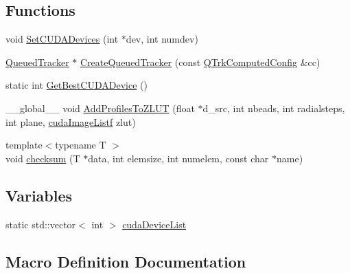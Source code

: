 \subsection*{Functions}
\begin{DoxyCompactItemize}
\item 
void \hyperlink{_queued_c_u_d_a_tracker_8cu_abda9d81bb47d6fd2b504bd3df9b2edae}{Set\+C\+U\+D\+A\+Devices} (int $\ast$dev, int numdev)
\item 
\hyperlink{class_queued_tracker}{Queued\+Tracker} $\ast$ \hyperlink{_queued_c_u_d_a_tracker_8cu_a04e7674e3705eefff30b5d6f5d3ab925}{Create\+Queued\+Tracker} (const \hyperlink{struct_q_trk_computed_config}{Q\+Trk\+Computed\+Config} \&cc)
\item 
static int \hyperlink{_queued_c_u_d_a_tracker_8cu_a19fc494f75b9dffe835d70fa70daae57}{Get\+Best\+C\+U\+D\+A\+Device} ()
\item 
\+\_\+\+\_\+global\+\_\+\+\_\+ void \hyperlink{_queued_c_u_d_a_tracker_8cu_aec3fff30d0a584140aaa1d322cc4a047}{Add\+Profiles\+To\+Z\+L\+UT} (float $\ast$d\+\_\+src, int nbeads, int radialsteps, int plane, \hyperlink{_queued_c_u_d_a_tracker_8h_a84de79f5d4b6e4c8d5622fe712c1bd69}{cuda\+Image\+Listf} zlut)
\item 
{\footnotesize template$<$typename T $>$ }\\void \hyperlink{_queued_c_u_d_a_tracker_8cu_a92f77d4c98e5e45869270339e47aa069}{checksum} (T $\ast$data, int elemsize, int numelem, const char $\ast$name)
\end{DoxyCompactItemize}
\subsection*{Variables}
\begin{DoxyCompactItemize}
\item 
static std\+::vector$<$ int $>$ \hyperlink{_queued_c_u_d_a_tracker_8cu_ab36f2f7f7b4b97a02a4597f7baef4f7a}{cuda\+Device\+List}
\end{DoxyCompactItemize}


\subsection{Macro Definition Documentation}

